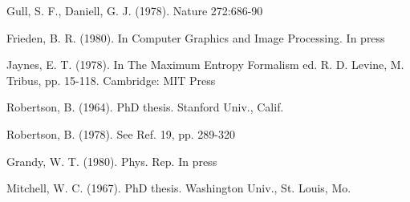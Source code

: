 \documentclass{article}
\begin{document}
\begin{thebibliography}{99}
 Gull, S. F., Daniell, G. J. (1978). Nature 272:686-90

 Frieden, B. R. (1980). In Computer Graphics and Image Processing. In press

 Jaynes, E. T. (1978). In The Maximum Entropy Formalism ed. R. D. Levine, M. Tribus, pp. 15-118. Cambridge: MIT Press

 Robertson, B. (1964). PhD thesis. Stanford Univ., Calif.

 Robertson, B. (1978). See Ref. 19, pp. 289-320

 Grandy, W. T. (1980). Phys. Rep. In press

 Mitchell, W. C. (1967). PhD thesis. Washington Univ., St. Louis, Mo.

\end{thebibliography}
\end{document}
